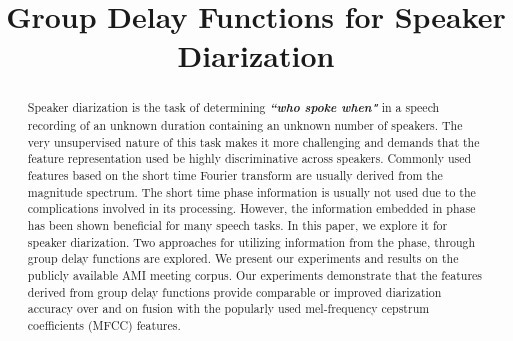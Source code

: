 \documentclass[conference]{IEEEtran}
\begin{document}
\title{Group Delay Functions for Speaker Diarization}


\author{
}


\maketitle


\begin{abstract}

Speaker diarization is the task of determining {\bf\textit{``who spoke when"}}
in a speech recording of an unknown duration containing an unknown number of
speakers. The very unsupervised nature of this task makes it more challenging
and demands that the feature representation used be  highly discriminative across 
speakers.
Commonly used features based on the short time Fourier transform are usually
derived from the magnitude spectrum. The short time phase information is usually
not used due to the complications involved in its processing. However, the information
embedded in phase has been shown beneficial for many speech tasks. In this
paper, we explore it for speaker diarization. Two approaches for utilizing
information from the phase, through group delay functions are explored.
We present our experiments and results on the 
publicly available AMI meeting corpus. Our experiments demonstrate that the features
derived from group delay functions provide comparable or improved diarization
accuracy over and on fusion with the popularly used mel-frequency cepstrum
coefficients (MFCC) features. \\

\end{abstract}
\IEEEpeerreviewmaketitle
\end{document}
